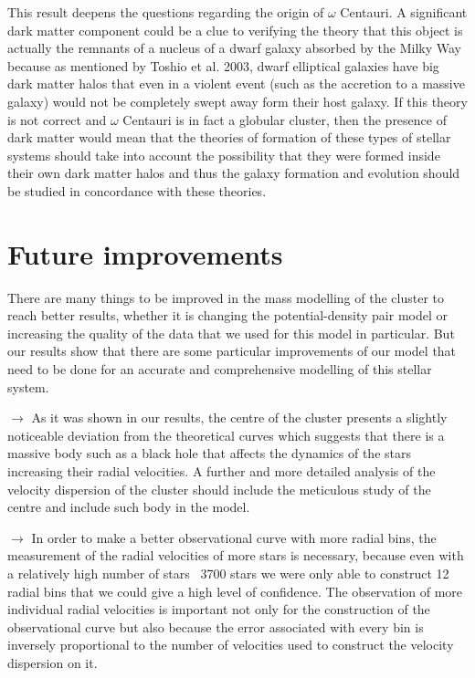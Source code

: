This result deepens the questions regarding the origin of $\omega$ Centauri. A significant dark matter component could be a clue to verifying the theory that this object is actually the remnants of a nucleus of a dwarf galaxy absorbed by the Milky Way because as mentioned by Toshio et al. 2003, dwarf elliptical galaxies have big dark matter halos that even in a violent event (such as the accretion to a massive galaxy) would not be completely swept away form their host galaxy. If this theory is not correct and $\omega$ Centauri is in fact a globular cluster, then the presence of dark matter would mean that the theories of formation of these types of stellar systems should take into account the possibility that they were formed inside their own dark matter halos and thus the galaxy formation and evolution should be studied in concordance with these theories. 

\section{Future improvements}

There are many things to be improved in the mass modelling of the cluster to reach better results, whether it is changing the potential-density pair model or increasing the quality of the data that we used for this model in particular. But our results show that there are some particular improvements of our model that need to be done for an accurate and comprehensive modelling of this stellar system.

$\rightarrow$ As it was shown in our results, the centre of the cluster presents a slightly noticeable deviation from the theoretical curves which suggests that there is a massive body such as a black hole that affects the dynamics of the stars increasing their radial velocities. A further and more detailed analysis of the velocity dispersion of the cluster should include the meticulous study of the centre and include such body in the model.

$\rightarrow$ In order to make a better observational curve with more radial bins, the measurement of the radial velocities of more stars is necessary, because even with a relatively high number of stars ~3700 stars we were only able to construct 12 radial bins that we could give a high level of confidence. The observation of more individual radial velocities is important not only for the construction of the observational curve but also because the error associated with every bin is inversely proportional to the number of velocities used to construct the velocity dispersion on it. 

